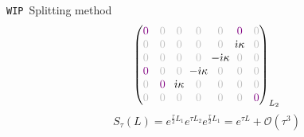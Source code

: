 \documentclass{beamer}
\newcommand{\I}{\dot{\imath}}
\begin{document}
\begin{frame}{{\small\texttt{WIP}\ }Splitting method}
$${\begin{pmatrix}
      \textcolor{violet}{0} &  \gz & \gz                      &  \gz                      &  \gz                      & \textcolor{violet}{0}            & \gz \\
      \gz &  \gz & \gz                      &  \gz                      &  \gz                      & \hspace{-0.125cm}{\I\kappa}\hspace{-0.125cm} & \gz \\ 
      \gz &  \gz & \gz                      &  \gz                      & \hspace{-0.125cm}{-\I\kappa}\hspace{-0.125cm} & \gz                      & \gz \\ 
      \textcolor{violet}{0}  &  \gz & \gz                      & \hspace{-0.125cm}{-\I\kappa}\hspace{-0.125cm} &  \gz                      & \gz                      & \gz \\ 
      \gz & \textcolor{violet}{0}   & \hspace{-0.125cm}{\I\kappa}\hspace{-0.125cm} &  \gz                      &  \gz                      & \gz                      & \gz \\ 
      \gz &  \gz & \gz                      &  \gz                      &  \gz                      & \gz                      & \textcolor{violet}{0} \\ 
    \end{pmatrix}}_{L_2}
  $$
  $$
    S_\tau(L) = e^{\frac{\tau}{2}L_1}e^{\tau L_2}e^{\frac{\tau}{2}L_1} = e^{\tau L} + \mathcal{O}(\tau^3)
  $$
\end{frame}
\end{document}
